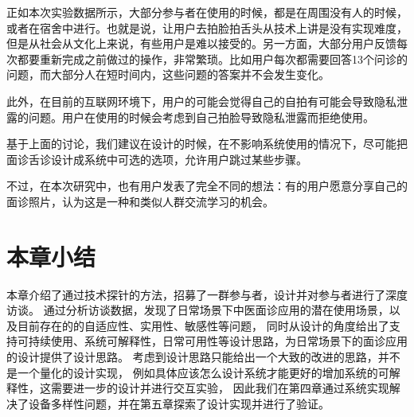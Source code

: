 正如本次实验数据所示，大部分参与者在使用的时候，都是在周围没有人的时候，或者在宿舍中进行。也就是说，让用户去拍脸拍舌头从技术上讲是没有实现难度，但是从社会从文化上来说，有些用户是难以接受的。另一方面，大部分用户反馈每次都要重新完成之前做过的操作，非常繁琐。比如用户每次都需要回答13个问诊的问题，而大部分人在短时间内，这些问题的答案并不会发生变化。

此外，在目前的互联网环境下，用户的可能会觉得自己的自拍有可能会导致隐私泄露的问题。用户在使用的时候会考虑到自己拍脸导致隐私泄露而拒绝使用。

基于上面的讨论，我们建议在设计的时候，在不影响系统使用的情况下，尽可能把面诊舌诊设计成系统中可选的选项，允许用户跳过某些步骤。

不过，在本次研究中，也有用户发表了完全不同的想法：有的用户愿意分享自己的面诊照片，认为这是一种和类似人群交流学习的机会。

\section{本章小结}


本章介绍了通过技术探针的方法，招募了一群参与者，设计并对参与者进行了深度访谈。
通过分析访谈数据，发现了日常场景下中医面诊应用的潜在使用场景，以及目前存在的的自适应性、实用性、敏感性等问题，
同时从设计的角度给出了支持可持续使用、系统可解释性，日常可用性等设计思路，为日常场景下的面诊应用的设计提供了设计思路。
考虑到设计思路只能给出一个大致的改进的思路，并不是一个量化的设计实现，
例如具体应该怎么设计系统才能更好的增加系统的可解释性，这需要进一步的设计并进行交互实验，
因此我们在第四章通过系统实现解决了设备多样性问题，并在第五章探索了设计实现并进行了验证。

% 










